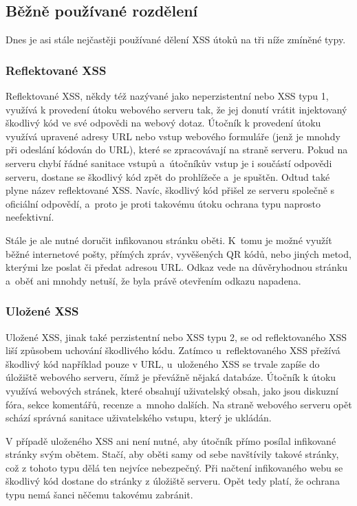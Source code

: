 \documentclass[11pt, conference, a4paper]{IEEEtran}
\begin{document}
\subsection{Běžně používané rozdělení}
Dnes je asi stále nejčastěji používané dělení XSS útoků na tři níže zmíněné typy. 

\subsubsection{Reflektované XSS}
Reflektované XSS, někdy též nazývané jako neperzistentní nebo XSS typu 1, využívá k provedení útoku webového serveru tak, že jej donutí vrátit injektovaný škodlivý kód ve své odpovědi na webový dotaz. Útočník k provedení útoku využívá upravené adresy URL nebo vstup webového formuláře (jenž je mnohdy při odeslání kódován do URL), které se zpracovávají na straně serveru. Pokud na serveru chybí řádné sanitace vstupů a~útočníkův vstup je i součástí odpovědi serveru, dostane se škodlivý kód zpět do prohlížeče a~je spuštěn. Odtud také plyne název reflektované XSS. Navíc, škodlivý kód přišel ze serveru společně s oficiální odpovědí, a~proto je proti takovému útoku ochrana typu  naprosto neefektivní. 

Stále je ale nutné doručit infikovanou stránku oběti. K~tomu je možné využít běžné internetové pošty, přímých zpráv, vyvěšených QR kódů, nebo jiných metod, kterými lze poslat či předat adresou URL. Odkaz vede na důvěryhodnou stránku a~oběť ani mnohdy netuší, že byla právě otevřením odkazu napadena.

\subsubsection{Uložené XSS}
Uložené XSS, jinak také perzistentní nebo XSS typu 2, se od reflektovaného XSS liší způsobem uchování škodlivého kódu. Zatímco u~reflektovaného XSS přežívá škodlivý kód například pouze v URL, u~uloženého XSS se trvale zapíše do úložiště webového serveru, čímž je převážně nějaká databáze. Útočník k útoku využívá webových stránek, které obsahují uživatelský obsah, jako jsou diskuzní fóra, sekce komentářů, recenze a~mnoho dalších. Na straně webového serveru opět schází správná sanitace uživatelského vstupu, který je ukládán. 

V případě uloženého XSS ani není nutné, aby útočník přímo posílal infikované stránky svým obětem. Stačí, aby oběti samy od sebe navštívily takové stránky, což z tohoto typu dělá ten nejvíce nebezpečný. Při načtení infikovaného webu se škodlivý kód dostane do stránky z úložiště serveru. Opět tedy platí, že ochrana typu  nemá šanci něčemu takovému zabránit.~\cite{XSS-owasp}
\end{document}
